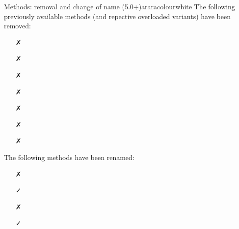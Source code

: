 \begin{messagebox}{Methods: removal and change of name (5.0+)}{araracolour}{\icinfo}{white}
The following previously available methods (and repective overloaded variants) have been removed:

\begin{itemize}
\item[\textcolor{warningcolour}{\faClose}] 
\item[\textcolor{warningcolour}{\faClose}] 
\item[\textcolor{warningcolour}{\faClose}] 
\item[\textcolor{warningcolour}{\faClose}] 
\item[\textcolor{warningcolour}{\faClose}] 
\item[\textcolor{warningcolour}{\faClose}] 
\item[\textcolor{warningcolour}{\faClose}] 
\end{itemize}

The following methods have been renamed:
\begin{itemize}
\item[\textcolor{warningcolour}{\faClose}] 

\vspace{.5em}

\hspace{2cm}\textcolor{teal}{\faArrowDown}

\item[\textcolor{okcolour}{\faCheck}]

\vspace{1em}

\item[\textcolor{warningcolour}{\faClose}] 

\vspace{.5em}

\hspace{2cm}\textcolor{teal}{\faArrowDown}

\item[\textcolor{okcolour}{\faCheck}] 


\end{itemize}
\end{messagebox}
